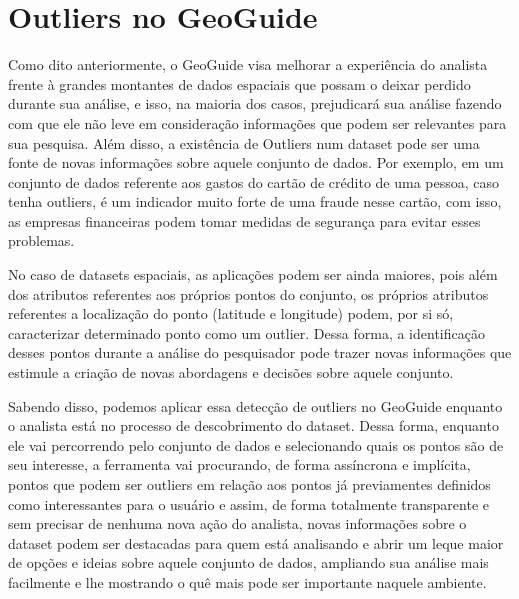 \section{Outliers no GeoGuide}

Como dito anteriormente, o GeoGuide visa melhorar a experiência do analista frente à grandes montantes de dados espaciais que possam o deixar perdido durante sua análise, e isso, na maioria dos casos, prejudicará sua análise fazendo com que ele não leve em consideração informações que podem ser relevantes para sua pesquisa. Além disso, a existência de Outliers num dataset pode ser uma fonte de novas informações sobre aquele conjunto de dados. Por exemplo, em um conjunto de dados referente aos gastos do cartão de crédito de uma pessoa, caso tenha outliers, é um indicador muito forte de uma fraude nesse cartão, com isso, as empresas financeiras podem tomar medidas de segurança para evitar esses problemas.

No caso de datasets espaciais, as aplicações podem ser ainda maiores, pois além dos atributos referentes aos próprios pontos do conjunto, os próprios atributos referentes a localização do ponto (latitude e longitude) podem, por si só, caracterizar determinado ponto como um outlier. Dessa forma, a identificação desses pontos durante a análise do pesquisador pode trazer novas informações que estimule a criação de novas abordagens e decisões sobre aquele conjunto.

Sabendo disso, podemos aplicar essa detecção de outliers no GeoGuide enquanto o analista está no processo de descobrimento do dataset. Dessa forma, enquanto ele vai percorrendo pelo conjunto de dados e selecionando quais os pontos são de seu interesse, a ferramenta vai procurando, de forma assíncrona e implícita, pontos que podem ser outliers em relação aos pontos já previamentes definidos como interessantes para o usuário e assim, de forma totalmente transparente e sem precisar de nenhuma nova ação do analista, novas informações sobre o dataset podem ser destacadas para quem está analisando e abrir um leque maior de opções e ideias sobre aquele conjunto de dados, ampliando sua análise mais facilmente e lhe mostrando o quê mais pode ser importante naquele ambiente.

